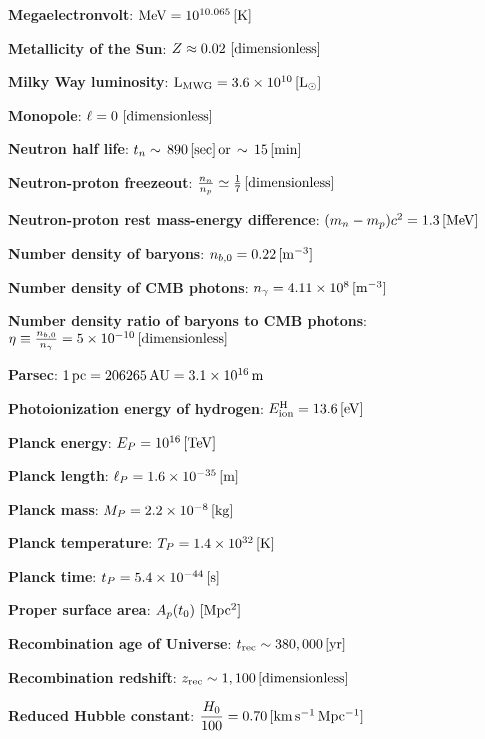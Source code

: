 \documentclass[a4paper,11pt]{article}
\begin{document}
{\noindent}\textbf{Megaelectronvolt}: ${\rm MeV} = 10^{10.065}\,[{\rm K}]$

{\noindent}\textbf{Metallicity of the Sun}: $Z\approx0.02 ~ [{\rm dimensionless}]$

{\noindent}\textbf{Milky Way luminosity}: ${\rm L_{MWG}} = 3.6\times10^{10}\,[{\rm L}_\odot]$

{\noindent}\textbf{Monopole}: $\ell=0 ~ [{\rm dimensionless}]$

{\noindent}\textbf{Neutron half life}: $t_n\sim\,890\,[{\rm sec}]\,{\rm or}\,\sim\,15\,[{\rm min}]$

{\noindent}\textbf{Neutron-proton freezeout}: $\frac{n_n}{n_p} \simeq \frac{1}{7}\,[{\rm dimensionless}]$

{\noindent}\textbf{Neutron-proton rest mass-energy difference}: $(m_n-m_p)c^2 = 1.3\,[{\rm MeV}]$

{\noindent}\textbf{Number density of baryons}: $n_{b,0} = 0.22\,[{\rm m^{-3}}]$

{\noindent}\textbf{Number density of CMB photons}: $n_\gamma= 4.11\times10^8\,[{\rm m^{-3}}]$

{\noindent}\textbf{Number density ratio of baryons to CMB photons}: $\eta \equiv \frac{n_{b,0}}{n_\gamma} = 5\times10^{-10}\,[{\rm dimensionless}]$

{\noindent}\textbf{Parsec}: $1\,{\rm pc} = 206265\,{\rm AU} = 3.1\times10^{16}\,{\rm m}$

{\noindent}\textbf{Photoionization energy of hydrogen}: $E^\mathrm{H}_\mathrm{ion} = 13.6\,[{\rm eV}]$

{\noindent}\textbf{Planck energy}: $E_P = 10^{16}\,[{\rm TeV}]$

{\noindent}\textbf{Planck length}: $\ell_P = 1.6\times10^{-35}\,[{\rm m}]$

{\noindent}\textbf{Planck mass}: $M_P = 2.2\times10^{-8}\,[{\rm kg}]$

{\noindent}\textbf{Planck temperature}: $T_P = 1.4\times10^{32}\,[{\rm K}]$

{\noindent}\textbf{Planck time}: $t_P = 5.4\times10^{-44}\,[{\rm s}]$

{\noindent}\textbf{Proper surface area}: $A_p(t_0) ~ [{\rm Mpc^2}]$

{\noindent}\textbf{Recombination age of Universe}: $t_\mathrm{rec} \sim 380,000\,[{\rm yr}]$

{\noindent}\textbf{Recombination redshift}: $z_\mathrm{rec}\sim1,100\,[{\rm dimensionless}]$

{\noindent}\textbf{Reduced Hubble constant}: $\dfrac{H_0}{100} = 0.70\,[{\rm km\,s^{-1}\,Mpc^{-1}}]$
\end{document}
